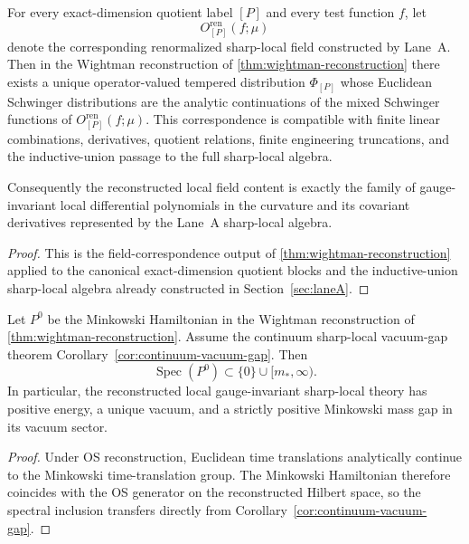 \begin{corollary}\label{cor:field-correspondence}
For every exact-dimension quotient label $[P]$ and every test function $f$, let
\[
O^{\mathrm{ren}}_{[P]}(f;\mu)
\]
denote the corresponding renormalized sharp-local field constructed by Lane~A. Then in the Wightman reconstruction of \cref{thm:wightman-reconstruction} there exists a unique operator-valued tempered distribution $\Phi_{[P]}$ whose Euclidean Schwinger distributions are the analytic continuations of the mixed Schwinger functions of $O^{\mathrm{ren}}_{[P]}(f;\mu)$. This correspondence is compatible with finite linear combinations, derivatives, quotient relations, finite engineering truncations, and the inductive-union passage to the full sharp-local algebra.

Consequently the reconstructed local field content is exactly the family of gauge-invariant local differential polynomials in the curvature and its covariant derivatives represented by the Lane~A sharp-local algebra.
\end{corollary}

\begin{proof}
This is the field-correspondence output of \cref{thm:wightman-reconstruction} applied to the canonical exact-dimension quotient blocks and the inductive-union sharp-local algebra already constructed in Section~\ref{sec:laneA}.
\end{proof}

\begin{corollary}\label{cor:minkowski-gap}
Let $P^0$ be the Minkowski Hamiltonian in the Wightman reconstruction of \cref{thm:wightman-reconstruction}. Assume the continuum sharp-local vacuum-gap theorem Corollary~\ref{cor:continuum-vacuum-gap}. Then
\[
\operatorname{Spec}(P^0)\subset \{0\}\cup[m_*,\infty).
\]
In particular, the reconstructed local gauge-invariant sharp-local theory has positive energy, a unique vacuum, and a strictly positive Minkowski mass gap in its vacuum sector.
\end{corollary}

\begin{proof}
Under OS reconstruction, Euclidean time translations analytically continue to the Minkowski time-translation group. The Minkowski Hamiltonian therefore coincides with the OS generator on the reconstructed Hilbert space, so the spectral inclusion transfers directly from Corollary~\ref{cor:continuum-vacuum-gap}.
\end{proof}

